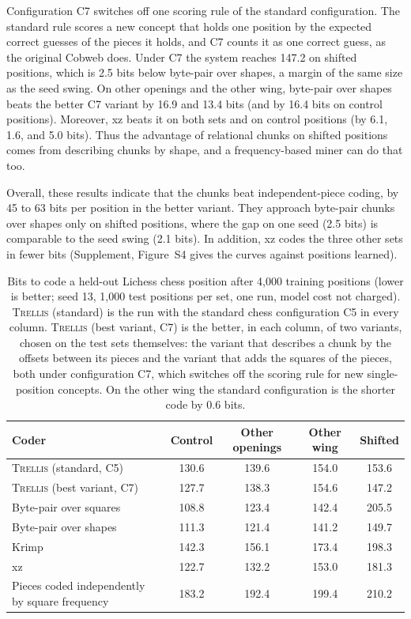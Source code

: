 \documentclass[11pt,letterpaper]{article}
\newcommand{\trellis}{\textsc{Trellis}}
\begin{document}
Configuration C7 switches off one scoring rule of the standard configuration. The standard rule scores a new concept that holds one position by the expected correct guesses of the pieces it holds, and C7 counts it as one correct guess, as the original Cobweb does.
Under C7 the system reaches 147.2 on shifted positions, which is 2.5 bits below byte-pair over shapes, a margin of the same size as the seed swing.
On other openings and the other wing, byte-pair over shapes beats the better C7 variant by 16.9 and 13.4 bits (and by 16.4 bits on control positions). Moreover, xz beats it on both sets and on control positions (by 6.1, 1.6, and 5.0 bits).
Thus the advantage of relational chunks on shifted positions comes from describing chunks by shape, and a frequency-based miner can do that too.

Overall, these results indicate that the chunks beat independent-piece coding, by 45 to 63 bits per position in the better variant.
They approach byte-pair chunks over shapes only on shifted positions, where the gap on one seed (2.5 bits) is comparable to the seed swing (2.1 bits). In addition, xz codes the three other sets in fewer bits (Supplement, Figure~S4 gives the curves against positions learned).

\begin{table}[!htbp]
\caption{Bits to code a held-out Lichess chess position after 4,000 training positions (lower is better; seed 13, 1,000 test positions per set, one run, model cost not charged). \trellis{} (standard) is the run with the standard chess configuration C5 in every column.
\trellis{} (best variant, C7) is the better, in each column, of two variants, chosen on the test sets themselves: the variant that describes a chunk by the offsets between its pieces and the variant that adds the squares of the pieces, both under configuration C7, which switches off the scoring rule for new single-position concepts. On the other wing the standard configuration is the shorter code by 0.6 bits.}
\label{tab:chess-bits}
\begin{center}
\small
\begin{tabular}{lcccc}
\toprule
Coder & Control & Other openings & Other wing & Shifted \\
\midrule
\trellis{} (standard, C5) & 130.6 & 139.6 & 154.0 & 153.6 \\
\trellis{} (best variant, C7) & 127.7 & 138.3 & 154.6 & 147.2 \\
Byte-pair over squares & 108.8 & 123.4 & 142.4 & 205.5 \\
Byte-pair over shapes & 111.3 & 121.4 & 141.2 & 149.7 \\
Krimp & 142.3 & 156.1 & 173.4 & 198.3 \\
xz & 122.7 & 132.2 & 153.0 & 181.3 \\
Pieces coded independently by square frequency & 183.2 & 192.4 & 199.4 & 210.2 \\
\bottomrule
\end{tabular}
\end{center}
\end{table}
\end{document}
